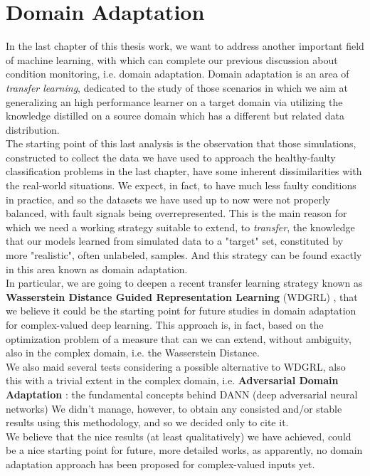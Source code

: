 \documentclass[../main.tex]{subfiles}
\begin{document}
\chapter{Domain Adaptation}
\label{ch:domain_adaptation}

In the last chapter of this thesis work, we want to address another important field of machine learning, with which can complete our previous discussion about condition monitoring, i.e. domain adaptation. Domain adaptation is an area of \textit{transfer learning}, dedicated to the study of those scenarios in which we aim at generalizing an high performance learner on a target domain via utilizing the knowledge distilled on a source domain which has a different but related data distribution.\\
The starting point of this last analysis is the observation that those simulations, constructed to collect the data we have used to approach the healthy-faulty classification problems in the last chapter, have some inherent dissimilarities with the real-world situations. We expect, in fact, to have much less faulty conditions in practice, and so the datasets we have used up to now were not properly balanced, with fault signals being overrepresented. This is the main reason for which we need a working strategy suitable to extend, to \textit{transfer}, the knowledge that our models learned from simulated data to a "target" set, constituted by more "realistic", often unlabeled, samples. And this strategy can be found exactly in this area known as domain adaptation. \\
In particular, we are going to deepen a recent transfer learning strategy known as \textbf{Wasserstein Distance Guided Representation Learning} (WDGRL) \cite{shen2018wasserstein}, that we believe it could be the starting point for future studies in domain adaptation for complex-valued deep learning. This approach is, in fact, based on the optimization problem of a measure that can we can extend, without ambiguity, also in the complex domain, i.e. the Wasserstein Distance. \\
We also maid several tests considering a possible alternative to WDGRL, also this with a trivial extent in the complex domain, i.e. \textbf{Adversarial Domain Adaptation} \cite{adversarial_domain_adaptation, ajakan2015domainadversarial, ganin2016domainadversarial}: the fundamental concepts behind DANN (deep adversarial neural networks) 
We didn't manage, however, to obtain any consisted and/or stable results using this methodology, and so we decided only to cite it.\\
We believe that the nice results (at least qualitatively) we have achieved, could be a nice starting point for future, more detailed works, as apparently, no domain adaptation approach has been proposed for complex-valued inputs yet.
\end{document}
